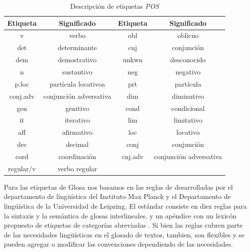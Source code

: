 \documentclass[letterpaper,12pt,oneside]{scrbook}
\theoremstyle{definition}
\begin{document}
	\begin{table}

		\centering

		\begin{tabular}{ c  c | c  c}

			\textbf{Etiqueta} & \textbf{Significado} & \textbf{Etiqueta} & \textbf{Significado} \\ \hline

			v & verbo & obl & oblicuo \\

			det & determinante & cnj & conjunción \\

			dem & demostrativo & unkwn & desconocido\\ 

			n & sustantivo & neg & negativo \\

			p.loc & partícula locativoa & prt & partícula \\

			conj.adv & conjunción adversativa & dim & diminutivo \\

			gen & genitivo & cond & condicional\\

			it & iterativo & lim & limitativo \\ 

			aff & afirmativo & loc & locativo \\

			dec & decimal & conj & conjunción \\

			cord & coordinación & cnj.adv & conjunción adversativa \\

			regular/v & verbo regular & & \\

		\end{tabular}

		\caption{Descripción de etiquetas \textit{POS}}

		\label{table:pos_descr}

	\end{table}

	
	Para las etiquetas de Glosa nos basamos en las reglas de \citet{comrie2008leipzig} desarrolladas por el departamento de lingüística del Instituto Max Planck y el Departamento de lingüística de la Universidad de Leipzing. El estándar consiste en diez reglas para la sintaxis y la semántica de glosas interlineales. y un apéndice con un lexicón propuesto de etiquetas de categorías abreviadas \citep{comrie2008leipzig}. Si bien las reglas cubren parte de las necesidades lingüísticas en el glosado de textos, tambien, son flexibles y se pueden agregar o modificar las convenciones dependiendo de las necesidades.
\end{document}
